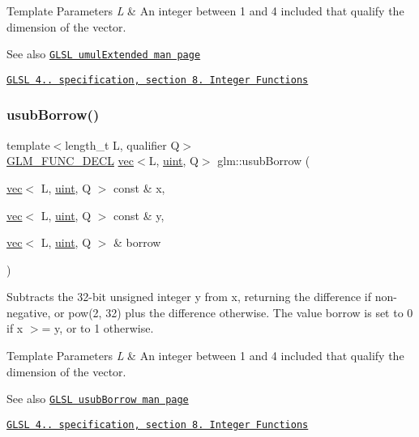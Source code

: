 \begin{DoxyTemplParams}{Template Parameters}
{\em L} & An integer between 1 and 4 included that qualify the dimension of the vector.\\
\hline
\end{DoxyTemplParams}
\begin{DoxySeeAlso}{See also}
\href{http://www.opengl.org/sdk/docs/manglsl/xhtml/umulExtended.xml}{\tt G\+L\+SL umul\+Extended man page} 

\href{http://www.opengl.org/registry/doc/GLSLangSpec.4.20.8.pdf}{\tt G\+L\+SL 4.. specification, section 8. Integer Functions} 
\end{DoxySeeAlso}
\mbox{\label{group__core__func__integer_gae3316ba1229ad9b9f09480833321b053}} 
\subsubsection{\texorpdfstring{usub\+Borrow()}{usubBorrow()}}
{\footnotesize\ttfamily template$<$length\+\_\+t L, qualifier Q$>$ \\
\hyperlink{setup_8hpp_ab2d052de21a70539923e9bcbf6e83a51}{G\+L\+M\+\_\+\+F\+U\+N\+C\+\_\+\+D\+E\+CL} \hyperlink{structglm_1_1vec}{vec}$<$L, \hyperlink{group__core__precision_ga4fd29415871152bfb5abd588334147c8}{uint}, Q$>$ glm\+::usub\+Borrow (\begin{DoxyParamCaption}\item[{\hyperlink{structglm_1_1vec}{vec}$<$ L, \hyperlink{group__core__precision_ga4fd29415871152bfb5abd588334147c8}{uint}, Q $>$ const \&}]{x,  }\item[{\hyperlink{structglm_1_1vec}{vec}$<$ L, \hyperlink{group__core__precision_ga4fd29415871152bfb5abd588334147c8}{uint}, Q $>$ const \&}]{y,  }\item[{\hyperlink{structglm_1_1vec}{vec}$<$ L, \hyperlink{group__core__precision_ga4fd29415871152bfb5abd588334147c8}{uint}, Q $>$ \&}]{borrow }\end{DoxyParamCaption})}

Subtracts the 32-\/bit unsigned integer y from x, returning the difference if non-\/negative, or pow(2, 32) plus the difference otherwise. The value borrow is set to 0 if x $>$= y, or to 1 otherwise.


\begin{DoxyTemplParams}{Template Parameters}
{\em L} & An integer between 1 and 4 included that qualify the dimension of the vector.\\
\hline
\end{DoxyTemplParams}
\begin{DoxySeeAlso}{See also}
\href{http://www.opengl.org/sdk/docs/manglsl/xhtml/usubBorrow.xml}{\tt G\+L\+SL usub\+Borrow man page} 

\href{http://www.opengl.org/registry/doc/GLSLangSpec.4.20.8.pdf}{\tt G\+L\+SL 4.. specification, section 8. Integer Functions} 
\end{DoxySeeAlso}
